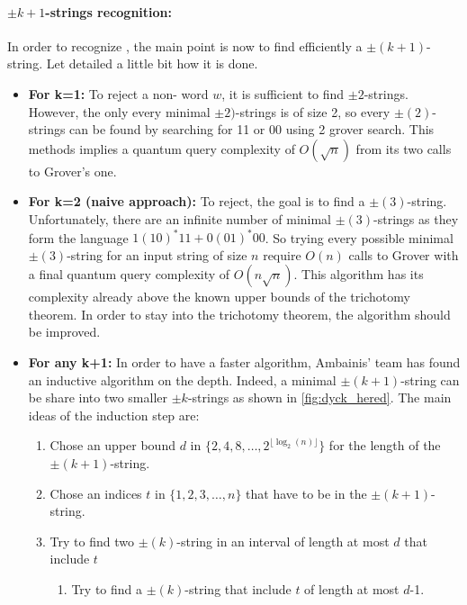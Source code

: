 \paragraph*{\textbf{$\pm k+1$-strings recognition:}}
In order to recognize , the main point is now to find efficiently
a $\pm(k+1)$-string. Let detailed a little bit how it is done.
\begin{itemize}
    \item \textbf{For k=1:} To reject a non- word $w$, it is sufficient to find
          $\pm 2$-strings. However, the only every minimal $\pm 2)$-strings is of size 2, so
          every $\pm(2)$-strings can be found by searching for 11 or 00 using 2 grover search.
          This methods implies a quantum query complexity of $O(\sqrt{n})$ from its two calls to
          Grover's one.
    \item \textbf{For k=2 (naive approach):} To reject, the goal is to find a $\pm(3)$-string. Unfortunately,
          there are an infinite number of minimal $\pm(3)$-strings as they form the language
          $1(10)^*11 + 0(01)^*00$. So trying every possible minimal $\pm(3)$-string for an input
          string of size $n$ require $O(n)$ calls to Grover with a final quantum query complexity
          of $O(n \sqrt{n})$. This algorithm has its complexity already above the known upper bounds
          of the trichotomy theorem. In order to stay into the trichotomy theorem, the algorithm
          should be improved.
    \item \textbf{For any k+1:} In order to have a faster algorithm, Ambainis' team has
          found an inductive algorithm on the depth. Indeed, a minimal $\pm(k+1)$-string can be
          share into two smaller $\pm k$-strings as shown in \autoref{fig:dyck_hered}. The main
          ideas of the induction step are:
          \begin{enumerate}
              \item \label{alg:step1} Chose an upper bound $d$ in $\{2, 4, 8, \ldots, 2^{\lfloor \log_2(n) \rfloor}\}$
                    for the length of the $\pm(k+1)$-string.
              \item \label{alg:step2} Chose an indices $t$ in $\{1, 2, 3, \ldots, n\}$ that have to be in the $\pm(k+1)$-string.
              \item \label{alg:step3} Try to find two $\pm(k)$-string in an interval of length at most $d$ that include $t$
                    \begin{enumerate}
                        \item \label{alg:step3:1} Try to find a $\pm(k)$-string that include $t$ of length at most $d$-1.

\end{enumerate}
\end{enumerate}
\end{itemize}

